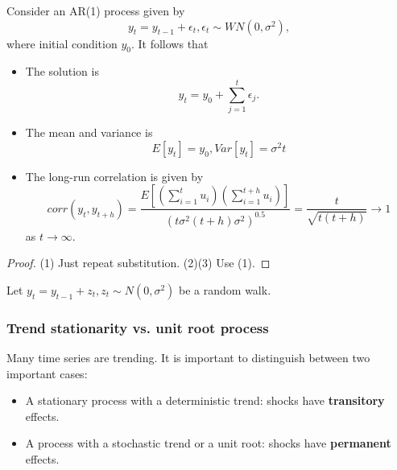 \begin{lemma}
Consider an AR(1) process given by
		$$y_t = y_{t-1} + \epsilon_t, \epsilon_t\sim WN(0,\sigma^2),$$
		where initial condition $y_0$.
It follows that
	\begin{itemize}
		\item The solution is
		$$y_t = y_0 + \sum_{j=1}^{t}\epsilon_j.$$
		\item The mean and variance is
		$$E[y_t] = y_0, Var[y_t] = \sigma^2 t$$
		\item The long-run correlation is given by
		$$corr(y_t,y_{t+h}) = \frac{E[(\sum_{i=1}^t u_i)(\sum_{i=1}^{t+h} u_i)]}{(t\sigma^2(t+h)\sigma^2)^{0.5}} = \frac{t}{\sqrt{t(t+h)}} \to 1$$
		as $t\to \infty$.
	\end{itemize}	
\end{lemma}
\begin{proof}
(1) Just repeat substitution. (2)(3) Use (1).
\end{proof}





\begin{remark}
Let $y_t = y_{t-1} + z_t,z_t\sim N(0,\sigma^2)$ be a random walk. 

\end{remark}


\subsubsection{Trend stationarity vs. unit root process}

\begin{note}
Many time series are trending. It is important to distinguish between two important cases:
\begin{itemize}
	\item A stationary process with a deterministic trend: shocks have \textbf{transitory} effects.
	\item A process with a stochastic trend or a unit root: shocks have \textbf{permanent} effects.	
\end{itemize}
\end{note}

